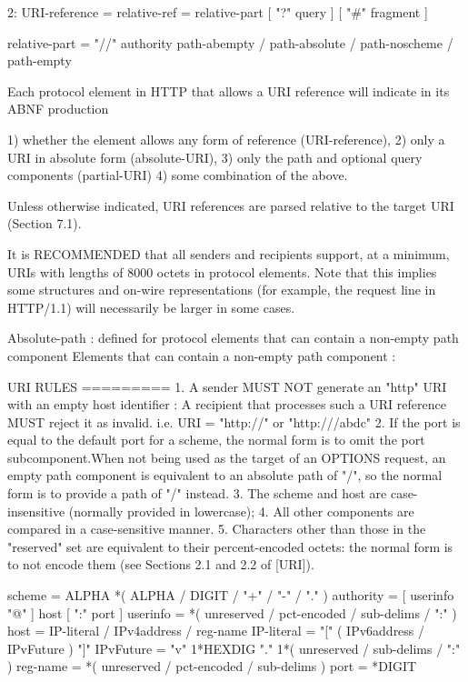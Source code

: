 2: URI-reference = relative-ref  = relative-part [ "?" query ] [ "#" fragment ]
		 	   
	relative-part = "//" authority path-abempty
    	            / path-absolute
        	        / path-noscheme
            		/ path-empty

Each protocol element in HTTP that allows a URI reference will indicate in its ABNF production 
      
      1) whether the element allows any form of reference (URI-reference), 
      2) only a URI in absolute form (absolute-URI),
      3) only the path and optional query components (partial-URI)
      4) some combination of the above. 
  
Unless otherwise indicated, URI references are parsed relative to the target URI (Section 7.1). 

It is RECOMMENDED that all senders and recipients support, at a minimum, URIs with lengths of 8000 octets in protocol elements. 
Note that this implies some structures and on-wire representations (for example, the request line in HTTP/1.1) will necessarily be larger in some cases.

Absolute-path : defined for protocol elements that can contain a non-empty path component
  Elements that can contain a non-empty path component :





URI RULES
=========
1. A sender MUST NOT generate an "http" URI with an empty host identifier : A recipient that processes such a URI reference MUST reject it as invalid.
    i.e. URI = "http://" or "http:///abdc" 
2. If the port is equal to the default port for a scheme, the normal form is to omit the port subcomponent.When not being used as the target of an OPTIONS request, 
    an empty path component is equivalent to an absolute path of "/", so the normal form is to provide a path of "/" instead.
3. The scheme and host are case-insensitive (normally provided in lowercase); 
4. All other components are compared in a case-sensitive manner.
5. Characters other than those in the "reserved" set are equivalent to their percent-encoded octets: 
    the normal form is to not encode them (see Sections 2.1 and 2.2 of [URI]).

scheme      = ALPHA *( ALPHA / DIGIT / "+" / "-" / "." )
authority   = [ userinfo "@" ] host [ ":" port ] 
  userinfo = *( unreserved / pct-encoded / sub-delims / ":" )
  host        = IP-literal / IPv4address / reg-name
      IP-literal = "[" ( IPv6address / IPvFuture  ) "]"
      IPvFuture  = "v" 1*HEXDIG "." 1*( unreserved / sub-delims / ":" )
      reg-name    = *( unreserved / pct-encoded / sub-delims )
      port        = *DIGIT
  
